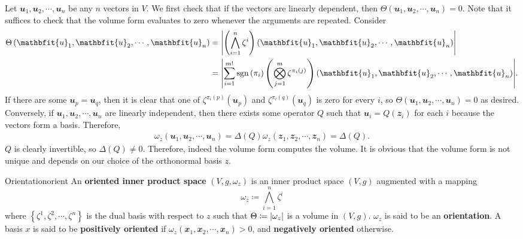\documentclass[math, code]{amznotes}
\theoremstyle{remark}
\begin{document}
Let $\mathbfit{u}_1, \mathbfit{u}_2, \cdots, \mathbfit{u}_n$ be any $n$ vectors in $V$. We first check that if the vectors are linearly dependent, then $\Theta\left(\mathbfit{u}_1, \mathbfit{u}_2, \cdots, \mathbfit{u}_n\right) = 0$. Note that it suffices to check that the volume form evaluates to zero whenever the arguments are repeated. Consider 
\begin{align*}
    \Theta\left(\mathbfit{u}_1, \mathbfit{u}_2, \cdots, \mathbfit{u}_n\right) & = \abs{\left(\bigwedge_{i = 1}^n\zeta^i\right)\left(\mathbfit{u}_1, \mathbfit{u}_2, \cdots, \mathbfit{u}_n\right)} \\
    & = \abs{\sum_{i = 1}^{m!}\mathrm{sgn}\left(\pi_i\right)\left(\bigotimes_{j = 1}^m\zeta^{\pi_i(j)}\right)\left(\mathbfit{u}_1, \mathbfit{u}_2, \cdots, \mathbfit{u}_n\right)}.
\end{align*}
If there are some $\mathbfit{u}_p = \mathbfit{u}_q$, then it is clear that one of $\zeta^{\pi_i(p)}\left(\mathbfit{u}_p\right)$ and $\zeta^{\pi_i(q)}\left(\mathbfit{u}_q\right)$ is zero for every $i$, so $\Theta\left(\mathbfit{u}_1, \mathbfit{u}_2, \cdots, \mathbfit{u}_n\right) = 0$ as desired. Conversely, if $\mathbfit{u}_1, \mathbfit{u}_2, \cdots, \mathbfit{u}_n$ are linearly independent, then there exists some operator $Q$ such that $\mathbfit{u}_i = Q\left(\mathbfit{z}_i\right)$ for each $i$ because the vectors form a basis. Therefore, 
\begin{align*}
    \omega_z\left(\mathbfit{u}_1, \mathbfit{u}_2, \cdots, \mathbfit{u}_n\right) = \Delta(Q)\omega_z\left(\mathbfit{z}_1, \mathbfit{z}_2, \cdots, \mathbfit{z}_n\right) = \Delta(Q).
\end{align*}
$Q$ is clearly invertible, so $\Delta(Q) \neq 0$. Therefore, indeed the volume form computes the volume. It is obvious that the volume form is not unique and depends on our choice of the orthonormal basis $z$.
\begin{dfnbox}{Orientation}{orient}
    An {\color{red} \textbf{oriented inner product space}} $(V, g, \omega_z)$ is an inner product space $(V, g)$ augmented with a mapping 
    \begin{equation*}
        \omega_z \coloneqq \bigwedge_{i = 1}^n\zeta^i
    \end{equation*}
    where $\left\{\zeta^1, \zeta^2, \cdots, \zeta^n\right\}$ is the dual basis with respect to $z$ such that $\Theta \coloneqq {\left\lvert {\omega_z} \right\rvert}$ is a volume in $(V, g)$. $\omega_z$ is said to be an {\color{red} \textbf{orientation}}. A basis $x$ is said to be {\color{red} \textbf{positively oriented}} if $\omega_z\left(\mathbfit{x}_1, \mathbfit{x}_2, \cdots, \mathbfit{x}_n\right) > 0$, and {\color{red} \textbf{negatively oriented}} otherwise.
\end{dfnbox}
\end{document}

